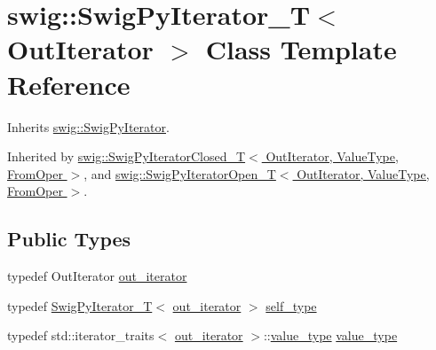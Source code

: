 \hypertarget{classswig_1_1_swig_py_iterator___t}{}\section{swig\+:\+:Swig\+Py\+Iterator\+\_\+T$<$ Out\+Iterator $>$ Class Template Reference}
\label{classswig_1_1_swig_py_iterator___t}


Inherits \hyperlink{structswig_1_1_swig_py_iterator}{swig\+::\+Swig\+Py\+Iterator}.



Inherited by \hyperlink{classswig_1_1_swig_py_iterator_closed___t}{swig\+::\+Swig\+Py\+Iterator\+Closed\+\_\+\+T$<$ Out\+Iterator, Value\+Type, From\+Oper $>$}, and \hyperlink{classswig_1_1_swig_py_iterator_open___t}{swig\+::\+Swig\+Py\+Iterator\+Open\+\_\+\+T$<$ Out\+Iterator, Value\+Type, From\+Oper $>$}.

\subsection*{Public Types}
\begin{DoxyCompactItemize}
\item 
typedef Out\+Iterator \hyperlink{classswig_1_1_swig_py_iterator___t_aec35545038c3d804975a147253f061e4}{out\+\_\+iterator}
\item 
typedef \hyperlink{classswig_1_1_swig_py_iterator___t}{Swig\+Py\+Iterator\+\_\+T}$<$ \hyperlink{classswig_1_1_swig_py_iterator___t_aec35545038c3d804975a147253f061e4}{out\+\_\+iterator} $>$ \hyperlink{classswig_1_1_swig_py_iterator___t_af10eb8078eb41f1dbca3701f27bd8e73}{self\+\_\+type}
\item 
typedef std\+::iterator\+\_\+traits$<$ \hyperlink{classswig_1_1_swig_py_iterator___t_aec35545038c3d804975a147253f061e4}{out\+\_\+iterator} $>$\+::\hyperlink{classswig_1_1_swig_py_iterator___t_a1441e2409c41706ad7aee977165f675e}{value\+\_\+type} \hyperlink{classswig_1_1_swig_py_iterator___t_a1441e2409c41706ad7aee977165f675e}{value\+\_\+type}
\end{DoxyCompactItemize}
